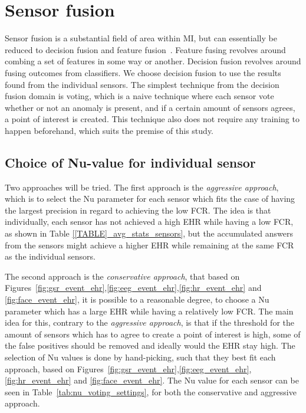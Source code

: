 \section{Sensor fusion}
Sensor fusion is a substantial field of area within MI, but can essentially be reduced to decision fusion and feature fusion~\cite{fusion_techniques}.
Feature fusing revolves around combing a set of features in some way or another.
Decision fusion revolves around fusing outcomes from classifiers.
We choose decision fusion to use the results found from the individual sensors.
The simplest technique from the decision fusion domain is voting, which is a naive technique where each sensor vote whether or not an anomaly is present, and if a certain amount of sensors agrees, a point of interest is created. This technique also does not require any training to happen beforehand, which suits the premise of this study.

\subsection{Choice of Nu-value for individual sensor}
Two approaches will be tried. The first approach is the \textit{aggressive approach}, which is to select the Nu
parameter for each sensor which fits the case of having the largest precision in regard to achieving the low FCR.
The idea is that individually, each sensor has not achieved a high EHR while having a low FCR, as shown in Table
\ref{[TABLE]_avg_stats_sensors}, but the accumulated answers from the sensors might achieve a higher EHR while remaining
at the same FCR as the individual sensors.

The second approach is the \textit{conservative approach}, that based on
Figures~\ref{fig:gsr_event_ehr},\ref{fig:eeg_event_ehr},\ref{fig:hr_event_ehr} and \ref{fig:face_event_ehr}, it is
possible to a reasonable degree, to choose a Nu parameter which has a large EHR while having a relatively low FCR. The
main idea for this, contrary to the \textit{aggressive approach}, is that if the threshold for the amount of sensors which has to agree to create a point of interest is high, some of the false positives should be removed and ideally would the EHR stay high.
The selection of Nu values is done by hand-picking, such that they best fit each approach, based on Figures~\ref{fig:gsr_event_ehr},\ref{fig:eeg_event_ehr},\ref{fig:hr_event_ehr} and \ref{fig:face_event_ehr}.
The Nu value for each sensor can be seen in Table~\ref{tab:nu_voting_settings}, for both the conservative and aggressive approach.

